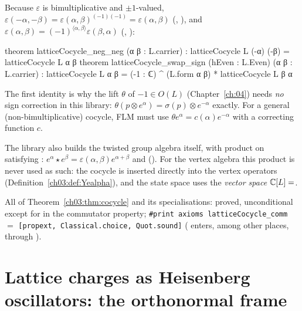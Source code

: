 \begin{remark}\label{ch03:rem:negneg}
Because $\varepsilon$ is bimultiplicative and $\pm1$-valued, $\varepsilon(-\alpha,-\beta)=
\varepsilon(\alpha,\beta)^{(-1)(-1)}=\varepsilon(\alpha,\beta)$
(, ), and
$\varepsilon(\alpha,\beta)=(-1)^{\langle\alpha,\beta\rangle}\varepsilon(\beta,\alpha)$
(, ):
\begin{leancode}
theorem latticeCocycle_neg_neg (α β : L.carrier) :
    latticeCocycle L (-α) (-β) = latticeCocycle L α β
theorem latticeCocycle_swap_sign (hEven : L.Even) (α β : L.carrier) :
    latticeCocycle L α β = (-1 : ℂ) ^ (L.form α β) * latticeCocycle L β α
\end{leancode}
The first identity is why the lift $\theta$ of $-1\in O(L)$ (Chapter~\ref{ch:04}) needs \emph{no}
sign correction in this library: $\theta(p\otimes e^\alpha)=\sigma(p)\otimes e^{-\alpha}$ exactly.
For a general (non-bimultiplicative) cocycle, FLM must use $\theta e^\alpha=c(\alpha)e^{-\alpha}$
with a correcting function $c$.
\end{remark}

The library also builds the twisted group algebra itself, with product
 on  satisfying :
$e^\alpha\star e^\beta=\varepsilon(\alpha,\beta)e^{\alpha+\beta}$ and 
(). For the vertex algebra this product is
never used as such: the cocycle is inserted directly into the vertex operators
(Definition~\ref{ch03:def:Yealpha}), and the state space uses the \emph{vector space}
${\mathbb{C}}[L]=$.

\begin{status}
All of Theorem~\ref{ch03:thm:cocycle} and its  specialisations: proved,
unconditional except for  in the commutator property;
\texttt{\#print axioms latticeCocycle\_comm} $=$ \texttt{[propext, Classical.choice, Quot.sound]}
( enters, among other places, through ).
\end{status}

\section{Lattice charges as Heisenberg oscillators: the orthonormal frame}\label{ch03:sec:frame}

